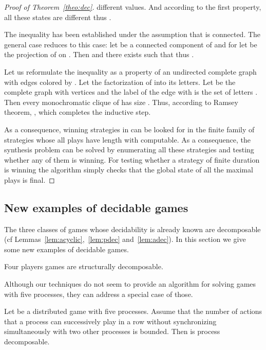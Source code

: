 \documentclass[a4paper,UKenglish]{lipics-v2016}
\begin{document}
\begin{proof}[Proof of Theorem~\ref{theo:dec}]
different values.
And according to the first property, all these states are different thus 
.

The inequality  has been established  under the assumption that  is connected.
The general case reduces to this case: let 
be a connected component of  and for 
let  be the projection of  on .
Then 
and
there exists  such that
 thus .



Let us reformulate the inequality  as a property of an undirected complete graph
with edges colored by .
Let  the factorization of  into its letters.
Let  be the complete graph with vertices 
and the label of the edge  with  is the set of letters .
Then every  monochromatic clique of  has size .
Thus, according to Ramsey theorem,
,
which completes the inductive step.

As a consequence, winning strategies in  can be looked for in the finite family of strategies
whose all plays have length 
with  computable.
As a consequence,
the synthesis problem
can be solved
by enumerating all these strategies and testing whether any of them is winning.
For testing whether a strategy of finite duration
is winning the algorithm simply checks that the global state of all the maximal plays is final.
\end{proof}



\subsection{New examples of decidable games}

The three classes of games whose decidability is already known
are decomposable  (cf Lemmas~\ref{lem:acyclic},~\ref{lem:pdec} and~\ref{lem:adec}).
In this section we give some new examples of decidable games.


\begin{lemma}\label{lem:fourp}
Four players games are  structurally decomposable.
\end{lemma}

Although our techniques do not seem to provide an algorithm for solving games with five processes, they can address a special case of those.

\begin{lemma}\label{lem:fivep}
Let  be a distributed game with five processes.
Assume that the number of actions
that a process can successively play in a row without 
synchronizing simultaneously with two other processes
is bounded.
Then  is process decomposable.
\end{lemma}
\end{document}
